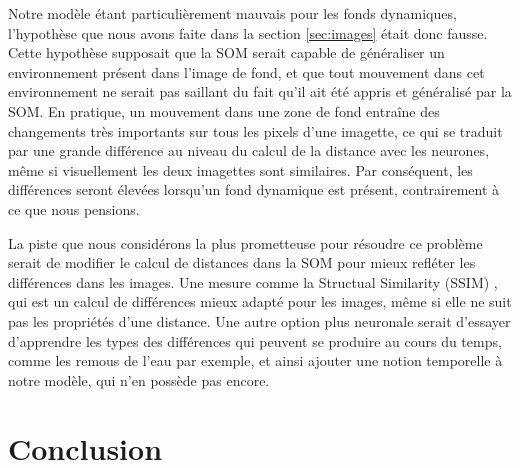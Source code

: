 	Notre modèle étant particulièrement mauvais pour les fonds dynamiques, l'hypothèse que nous avons faite dans la section \ref{sec:images} était donc fausse. Cette hypothèse supposait que la SOM serait capable de généraliser un environnement présent dans l'image de fond, et que tout mouvement dans cet environnement ne serait pas saillant du fait qu'il ait été appris et généralisé par la SOM. En pratique, un mouvement dans une zone de fond entraîne des changements très importants sur tous les pixels d'une imagette, ce qui se traduit par une grande différence au niveau du calcul de la distance avec les neurones, même si visuellement les deux imagettes sont similaires. Par conséquent, les différences seront élevées lorsqu'un fond dynamique est présent, contrairement à ce que nous pensions.

	La piste que nous considérons la plus prometteuse pour résoudre ce problème serait de modifier le calcul de distances dans la SOM pour mieux refléter les différences dans les images. Une mesure comme la Structual Similarity (SSIM) \cite{wang2004image}, qui est un calcul de différences mieux adapté pour les images, même si elle ne suit pas les propriétés d'une distance. Une autre option plus neuronale serait d'essayer d'apprendre les types des différences qui peuvent se produire au cours du temps, comme les remous de l'eau par exemple, et ainsi ajouter une notion temporelle à notre modèle, qui n'en possède pas encore.

	\section{Conclusion}
		

